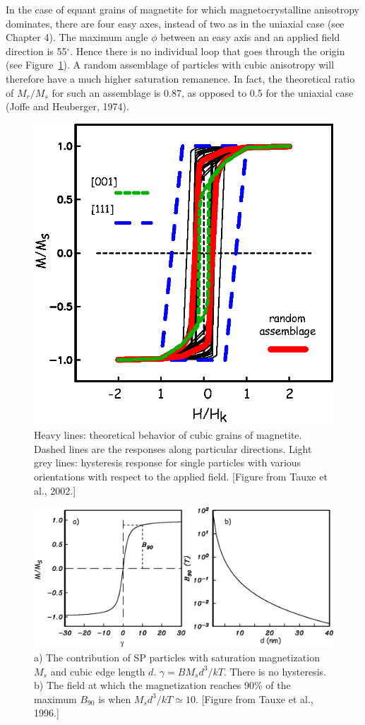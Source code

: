 In the case of  equant grains of magnetite for which magnetocrystalline anisotropy dominates, there are four easy axes, instead of two as in the uniaxial case (see Chapter 4).    The maximum angle $\phi$ between an easy axis and an applied field direction is 55$^{\circ}$.  Hence there is no individual loop that goes through the origin (see Figure~\ref{fig:cubic}).    A random assemblage of particles with 
cubic anisotropy will therefore have a much higher saturation remanence.  In fact, the theoretical ratio of $M_r/M_s$  for such an assemblage is 0.87, as opposed to 0.5 for the uniaxial case 
\nocite{joffe74}
(Joffe and Heuberger, 1974).      
\begin{figure}[h!tb]
\centering  \includegraphics[width=6 cm]{EPSfiles/cubicloops.eps}
\caption{Heavy lines: theoretical behavior of cubic grains of magnetite.  Dashed lines are the responses along particular directions.  Light grey lines: hysteresis response for single particles with various orientations with respect to the applied field. [Figure from Tauxe et al., 2002.]}
\label{fig:cubic}
\end{figure}  
\nocite{tauxe02}


\begin{figure}[htb]
\centering  \includegraphics[width=12 cm]{EPSfiles/loops.eps}
\caption{a) The contribution of SP particles with saturation magnetization $M_s$ and cubic edge length $d$.  $\gamma = BM_s d^3/kT$.  There is no hysteresis.  b) The field at which the magnetization reaches 90\% of the maximum $B_{90}$ is when $ M_s d^3/kT\simeq 10$. [Figure from Tauxe et al.,  1996.] }
\label{fig:loops}
\end{figure}
\nocite{tauxe96}


